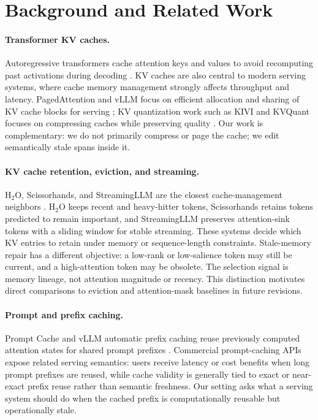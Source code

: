 \documentclass[11pt]{article}
\begin{document}
\section{Background and Related Work}

\paragraph{Transformer KV caches.}
Autoregressive transformers cache attention keys and values to avoid
recomputing past activations during decoding \cite{vaswani2017attention}. KV
caches are also central to modern serving systems, where cache memory
management strongly affects throughput and latency. PagedAttention and vLLM
focus on efficient allocation and sharing of KV cache blocks for serving
\cite{kwon2023vllm}; KV quantization work such as KIVI and KVQuant focuses on
compressing caches while preserving quality \cite{liu2024kivi,hooper2024kvquant}.
Our work is complementary: we do not primarily compress or page the cache; we
edit semantically stale spans inside it.

\paragraph{KV cache retention, eviction, and streaming.}
H$_2$O, Scissorhands, and StreamingLLM are the closest cache-management
neighbors \cite{zhang2023h2o,liu2023scissorhands,xiao2023streamingllm}. H$_2$O
keeps recent and heavy-hitter tokens, Scissorhands retains tokens predicted to
remain important, and StreamingLLM preserves attention-sink tokens with a
sliding window for stable streaming. These systems decide which KV entries to
retain under memory or sequence-length constraints. Stale-memory repair has a
different objective: a low-rank or low-salience token may still be current, and
a high-attention token may be obsolete. The selection signal is memory lineage,
not attention magnitude or recency. This distinction motivates direct
comparisons to eviction and attention-mask baselines in future revisions.

\paragraph{Prompt and prefix caching.}
Prompt Cache and vLLM automatic prefix caching reuse previously computed
attention states for shared prompt prefixes \cite{gim2024promptcache,kwon2023vllm}.
Commercial prompt-caching APIs expose related serving semantics: users receive
latency or cost benefits when long prompt prefixes are reused, while cache
validity is generally tied to exact or near-exact prefix reuse rather than
semantic freshness. Our setting asks what a serving system should do when the
cached prefix is computationally reusable but operationally stale.
\end{document}
